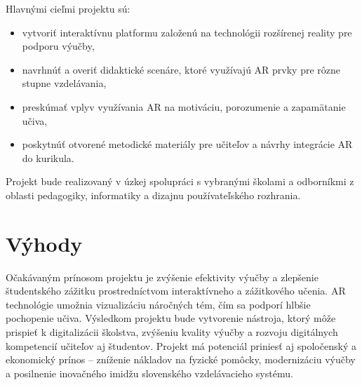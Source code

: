 \documentclass[a4paper,24pt]{article}
\begin{document}
Hlavnými cieľmi projektu sú:
\begin{itemize}
    \item vytvoriť interaktívnu platformu založenú na technológii rozšírenej reality pre podporu výučby,
    \item navrhnúť a overiť didaktické scenáre, ktoré využívajú AR prvky pre rôzne stupne vzdelávania,
    \item preskúmať vplyv využívania AR na motiváciu, porozumenie a zapamätanie učiva,
    \item poskytnúť otvorené metodické materiály pre učiteľov a návrhy integrácie AR do kurikula.
\end{itemize}

Projekt bude realizovaný v úzkej spolupráci s vybranými školami a odborníkmi z oblasti pedagogiky, informatiky a dizajnu používateľského rozhrania.

\vspace{2em}
\section{Výhody}

Očakávaným prínosom projektu je zvýšenie efektivity výučby a zlepšenie študentského zážitku prostredníctvom interaktívneho a zážitkového učenia. AR technológie umožnia vizualizáciu náročných tém, čím sa podporí hlbšie pochopenie učiva. Výsledkom projektu bude vytvorenie nástroja, ktorý môže prispieť k digitalizácii školstva, zvýšeniu kvality výučby a rozvoju digitálnych kompetencií učiteľov aj študentov. Projekt má potenciál priniesť aj spoločenský a ekonomický prínos – zníženie nákladov na fyzické pomôcky, modernizáciu výučby a posilnenie inovačného imidžu slovenského vzdelávacieho systému.
\end{document}
